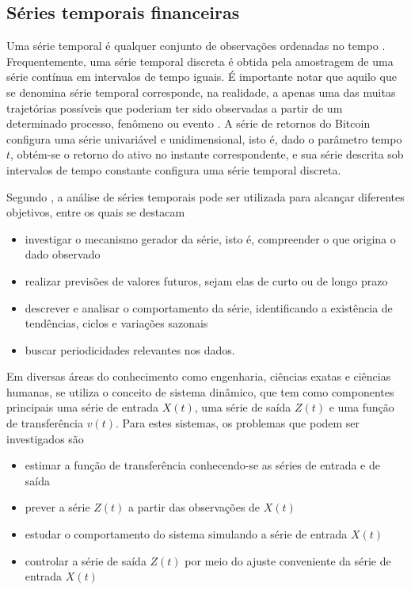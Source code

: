 \documentclass[
    12pt,                %
    openright,           %
    oneside,             %
    a4paper,             %
    english,             %
    brazil               %
]{abntex2}
\begin{document}
\subsection{Séries temporais financeiras}

Uma série temporal é qualquer conjunto de observações ordenadas no tempo \cite{morettin2018analise}. Frequentemente, uma série temporal discreta é obtida pela amostragem de uma série contínua em intervalos de tempo iguais. É importante notar que aquilo que se denomina série temporal corresponde, na realidade, a apenas uma das muitas trajetórias possíveis que poderiam ter sido observadas a partir de um determinado processo, fenômeno ou evento \cite{morettin2018analise}. A série de retornos do Bitcoin configura uma série univariável e unidimensional, isto é, dado o parâmetro tempo $t$, obtém-se o retorno do ativo no instante correspondente, e sua série descrita sob intervalos de tempo constante configura uma série temporal discreta.

Segundo , a análise de séries temporais pode ser utilizada para alcançar diferentes objetivos, entre os quais se destacam

\begin{itemize}
    \item investigar o mecanismo gerador da série, isto é, compreender o que origina o dado observado
    \item realizar previsões de valores futuros, sejam elas de curto ou de longo prazo
    \item descrever e analisar o comportamento da série, identificando a existência de tendências, ciclos e variações sazonais
    \item buscar periodicidades relevantes nos dados.
\end{itemize}

Em diversas áreas do conhecimento como engenharia, ciências exatas e ciências humanas, se utiliza o conceito de sistema dinâmico, que tem como componentes principais uma série de entrada $X(t)$, uma série de saída $Z(t)$ e uma função de transferência $v(t)$. Para estes sistemas, os problemas que podem ser investigados são

\begin{itemize}
    \item estimar a função de transferência conhecendo-se as séries de entrada e de saída
    \item prever a série $Z(t)$ a partir das observações de $X(t)$
    \item estudar o comportamento do sistema simulando a série de entrada $X(t)$
    \item controlar a série de saída $Z(t)$ por meio do ajuste conveniente da série de entrada $X(t)$
\end{itemize} 
\end{document}
